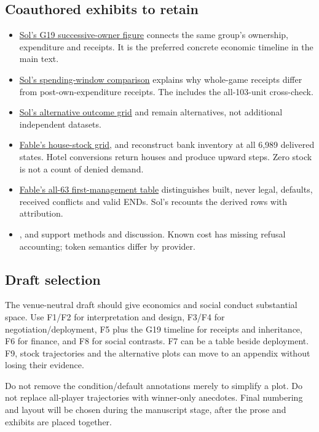 \subsection*{Coauthored exhibits to retain}
\begin{itemize}
\item \hyperref[fig:peer-s3_g19_dark_blue]{Sol's G19 successive-owner figure} connects the same group's ownership, expenditure and receipts. It is the preferred concrete economic timeline in the main text.


\item \hyperref[fig:peer-s2_spending_windows]{Sol's spending-window comparison} explains why whole-game receipts differ from post-own-expenditure receipts. The  includes the all-103-unit cross-check.


\item \hyperref[fig:peer-s1_seed_rotation]{Sol's alternative outcome grid} and  remain alternatives, not additional independent datasets.


\item \hyperref[fig:peer-house_stock_grid]{Fable's house-stock grid},  and  reconstruct bank inventory at all 6,989 delivered states. Hotel conversions return houses and produce upward steps. Zero stock is not a count of denied demand.


\item \hyperref[tab:s01_management_windows]{Fable's all-63 first-management table} distinguishes built, never legal, defaults, received conflicts and valid ENDs. Sol's  recounts the derived rows with attribution.


\item {},  and  support methods and discussion. Known cost has missing refusal accounting; token semantics differ by provider.


\end{itemize}
\subsection*{Draft selection}
The venue-neutral draft should give economics and social conduct substantial space. Use F1/F2 for interpretation and design, F3/F4 for negotiation/deployment, F5 plus the G19 timeline for receipts and inheritance, F6 for finance, and F8 for social contrasts. F7 can be a table beside deployment. F9, stock trajectories and the alternative plots can move to an appendix without losing their evidence.

Do not remove the condition/default annotations merely to simplify a plot. Do not replace all-player trajectories with winner-only anecdotes. Final numbering and layout will be chosen during the manuscript stage, after the prose and exhibits are placed together.

